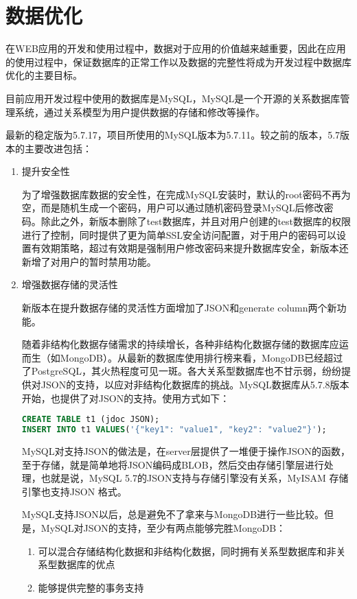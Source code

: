 \chapter{数据优化}
\label{cha:Database}
在WEB应用的开发和使用过程中，数据对于应用的价值越来越重要，因此在应用的使用过程中，保证数据库的正常工作以及数据的完整性将成为开发过程中数据库优化的主要目标。

目前应用开发过程中使用的数据库是MySQL，MySQL是一个开源的关系数据库管理系统，通过关系模型为用户提供数据的存储和修改等操作。

最新的稳定版为5.7.17，项目所使用的MySQL版本为5.7.11。较之前的版本，5.7版本的主要改进包括：
\begin{enumerate}
    \item 提升安全性

    为了增强数据库数据的安全性，在完成MySQL安装时，默认的root密码不再为空，而是随机生成一个密码，用户可以通过随机密码登录MySQL后修改密码。除此之外，新版本删除了test数据库，并且对用户创建的test数据库的权限进行了控制，同时提供了更为简单SSL安全访问配置，对于用户的密码可以设置有效期策略，超过有效期是强制用户修改密码来提升数据库安全，新版本还新增了对用户的暂时禁用功能。
    \item 增强数据存储的灵活性

    新版本在提升数据存储的灵活性方面增加了JSON和generate column两个新功能。

    随着非结构化数据存储需求的持续增长，各种非结构化数据存储的数据库应运而生（如MongoDB）。从最新的数据库使用排行榜来看，MongoDB已经超过了PostgreSQL，其火热程度可见一斑。各大关系型数据库也不甘示弱，纷纷提供对JSON的支持，以应对非结构化数据库的挑战。MySQL数据库从5.7.8版本开始，也提供了对JSON的支持。使用方式如下：
\begin{lstlisting}[language=sql,numbers=none]
CREATE TABLE t1 (jdoc JSON);
INSERT INTO t1 VALUES('{"key1": "value1", "key2": "value2"}');
\end{lstlisting}
MySQL对支持JSON的做法是，在server层提供了一堆便于操作JSON的函数，至于存储，就是简单地将JSON编码成BLOB，然后交由存储引擎层进行处理，也就是说，MySQL 5.7的JSON支持与存储引擎没有关系，MyISAM 存储引擎也支持JSON 格式。

MySQL支持JSON以后，总是避免不了拿来与MongoDB进行一些比较。但是，MySQL对JSON的支持，至少有两点能够完胜MongoDB：
\begin{enumerate}
\item 可以混合存储结构化数据和非结构化数据，同时拥有关系型数据库和非关系型数据库的优点
\item 能够提供完整的事务支持
\end{enumerate}


\end{enumerate}
